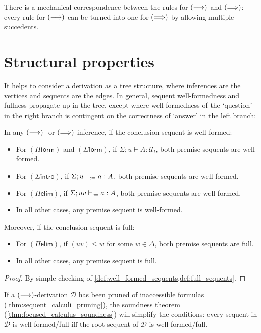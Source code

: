 \documentclass[twoside]{report}
\begin{document}
There is a mechanical correspondence between the rules for $(\longrightarrow)$ and $(\Longrightarrow)$: every rule for $(\longrightarrow)$ can be turned into one for $(\Longrightarrow)$ by allowing multiple succedents.

\section{Structural properties}
\label{sec:sequent_calculi_properties}

It helps to consider a derivation as a tree structure, where inferences are the vertices and sequents are the edges. In general, sequent well-formedness and fullness propagate up in the tree, except where well-formedness of the `question' in the right branch is contingent on the correctness of `answer' in the left branch:

\begin{proposition}
    \label{thm:well_formed_sequents_upwards}
    In any $(\longrightarrow)$- or $(\Longrightarrow)$-inference, if the conclusion sequent is well-formed:
    \begin{itemize}[noitemsep]
        \item For $(\Pi\mathsf{form})$ and $(\Sigma\mathsf{form})$, if $\Sigma; u \vdash A : \mathcal U_l$, both premise sequents are well-formed.
        \item For $(\Sigma\mathsf{intro})$, if $\Sigma; u \vdash_{:=} a : A$, both premise sequents are well-formed.
        \item For $(\Pi\mathsf{elim})$, if $\Sigma; uv \vdash_{:=} a : A$, both premise sequents are well-formed.
        \item In all other cases, any premise sequent is well-formed.
    \end{itemize}
    Moreover, if the conclusion sequent is full:
    \begin{itemize}[noitemsep]
        \item For $(\Pi\mathsf{elim})$, if $(uv) \leq w$ for some $w \in \Delta$, both premise sequents are full.
        \item In all other cases, any premise sequent is full.
    \end{itemize}
\end{proposition}

\begin{proof}
    By simple checking of \cref{def:well_formed_sequents,def:full_sequents}.
\end{proof}

If a $(\longrightarrow)$-derivation $\mathcal D$ has been pruned of inaccessible formulas (\cref{thm:sequent_calculi_pruning}), the soundness theorem (\cref{thm:focused_calculus_soundness}) will simplify the conditions: every sequent in $\mathcal D$ is well-formed/full iff the root sequent of $\mathcal D$ is well-formed/full.
\end{document}
